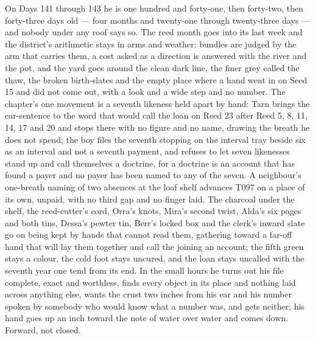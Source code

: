 \documentclass{design/chronicle}
\begin{document}
{On Days 141 through 143 he is one hundred and forty-one, then forty-two, then forty-three days old — four months and twenty-one through twenty-three days — and nobody under any roof says so. The reed month goes into its last week and the district’s arithmetic stays in arms and weather: bundles are judged by the arm that carries them, a cost asked as a direction is answered with the river and the pot, and the yard goes around the clean dark line, the finer grey called the thaw, the broken birth-slates and the empty place where a hand went in on Seed 15 and did not come out, with a look and a wide step and no number. The chapter’s one movement is a seventh likeness held apart by hand: Tarn brings the ear-sentence to the word that would call the loan on Reed 23 after Reed 5, 8, 11, 14, 17 and 20 and stops there with no figure and no name, drawing the breath he does not spend; the boy files the seventh stopping on the interval tray beside six as an interval and not a seventh payment, and refuses to let seven likenesses stand up and call themselves a doctrine, for a doctrine is an account that has found a payer and no payer has been named to any of the seven. A neighbour’s one-breath naming of two absences at the loaf shelf advances T097 on a place of its own, unpaid, with no third gap and no finger laid. The charcoal under the shelf, the reed-cutter’s cord, Orra’s knots, Mira’s second twist, Alda’s six pages and both tins, Dessa’s pewter tin, Berr’s locked box and the clerk’s inward slate go on being kept by hands that cannot read them, gathering toward a far-off hand that will lay them together and call the joining an account; the fifth green stays a colour, the cold foot stays uncured, and the loan stays uncalled with the seventh year one tend from its end. In the small hours he turns out his file complete, exact and worthless, finds every object in its place and nothing laid across anything else, wants the crust two inches from his ear and his number spoken by somebody who would know what a number was, and gets neither; his hand goes up an inch toward the note of water over water and comes down. Forward, not closed.

}
\end{document}
